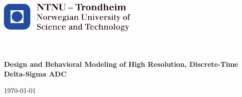 \begin{titlepage}
\includegraphics[height=1.5cm]{images/ntnu_logo.pdf}\\[1cm]   
\begin{center}

 
~\\[1.5cm]

\textsc{\Large }\\[3.5cm]

{\huge \bfseries Design and Behavioral Modeling of High Resolution, Discrete-Time 
Delta-Sigma ADC}		%
\\[2cm]
\begin{minipage}{0.4\textwidth}
    \centering
	\large
		\myauthor
\end{minipage}

\vfill

{\large \today}

\end{center}
\end{titlepage}